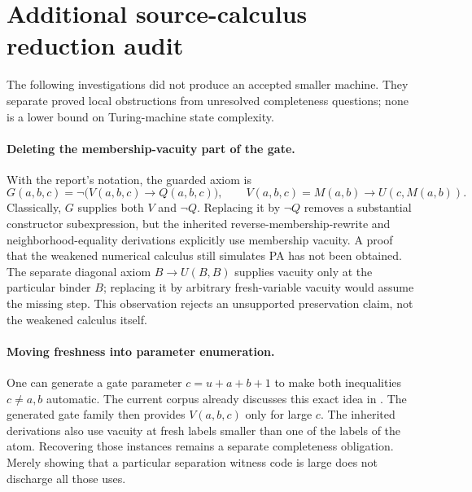 \section{Additional source-calculus reduction audit}
\label{sec:source-calculus-audit}
The following investigations did not produce an accepted smaller machine.
They separate proved local obstructions from unresolved completeness questions;
none is a lower bound on Turing-machine state complexity.

\paragraph{Deleting the membership-vacuity part of the gate.}
With the report's notation, the guarded axiom is
\[
 G(a,b,c)=\neg\bigl(V(a,b,c)\to Q(a,b,c)\bigr),\qquad
 V(a,b,c)=M(a,b)\to U(c,M(a,b)).
\]
Classically, $G$ supplies both $V$ and $\neg Q$.  Replacing it by
$\neg Q$ removes a substantial constructor subexpression, but the inherited
reverse-membership-rewrite and neighborhood-equality derivations explicitly
use membership vacuity.  A proof that the weakened numerical calculus still
simulates PA has not been obtained.  The separate diagonal axiom
$B\to U(B,B)$ supplies vacuity only at the particular binder $B$; replacing
it by arbitrary fresh-variable vacuity would assume the missing step.
This observation rejects an unsupported preservation claim, not the weakened
calculus itself.

\paragraph{Moving freshness into parameter enumeration.}
One can generate a gate parameter $c=u+a+b+1$ to make both inequalities
$c\ne a,b$ automatic.  The current corpus already discusses this exact
idea in
.
The generated gate family then provides $V(a,b,c)$ only for large $c$.
The inherited derivations also use vacuity at fresh labels smaller than
one of the labels of the atom.  Recovering those instances remains a
separate completeness obligation.  Merely showing that a particular
separation witness code is large does not discharge all those uses.

